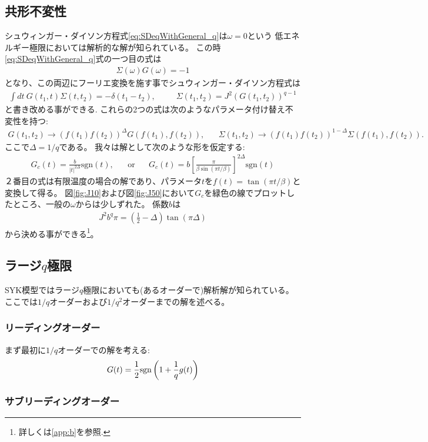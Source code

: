 \subsection{共形不変性}
シュウィンガー・ダイソン方程式\eqref{eq:SDeqWithGeneral_q}は$\omega = 0$という
低エネルギー極限においては解析的な解が知られている。
この時\eqref{eq:SDeqWithGeneral_q}式の一つ目の式は
\begin{align}
	\Sigma(\omega)G(\omega) = -1
\end{align}
となり、この両辺にフーリエ変換を施す事でシュウィンガー・ダイソン方程式は
\begin{align}
	\int dt\ G(t_1, t)\Sigma(t, t_2) = -\delta(t_1 - t_2),
	\hspace{30pt}
	\Sigma(t_1, t_2) = J^2 (G(t_1, t_2))^{q-1}
	\label{eq:conformalSD}
\end{align}
と書き改める事ができる.
これらの2つの式は次のようなパラメータ付け替え不変性を持つ:
\begin{align}
	G(t_1, t_2) \to (f(t_1)f(t_2))^{\Delta}G(f(t_1),f(t_2)),
	\hspace{20pt}
	\Sigma(t_1, t_2) \to (f(t_1)f(t_2))^{1 - \Delta}\Sigma(f(t_1),f(t_2)).
\end{align}
ここで$\Delta = 1 / q$である。
我々は解として次のような形を仮定する:
\begin{align}
	G_c(t) = \frac{b}{|t|^{2\Delta}}\mathrm{sgn}(t),
	\hspace{20pt}
	\mathrm{or}
	\hspace{20pt}
	G_c(t) = b\left[\frac{\pi}{\beta\sin(\pi t / \beta)}\right]^{2\Delta}\mathrm{sgn}(t)
	\label{eq:conformal_ansatz}
\end{align}
２番目の式は有限温度の場合の解であり、パラメータ$t$を$f(t) = \tan(\pi t / \beta)$と変換して得る。
図\ref{fig:J10}および図\ref{fig:J50}において$G_c$を緑色の線でプロットしたところ、一般の$\omega$からは少しずれた。
係数$b$は
\begin{align}
	J^2 b^q \pi = \left(\frac{1}{2} - \Delta \right)\tan(\pi \Delta)
\end{align}
から決める事ができる\footnote{詳しくは\ref{app:b}を参照.}。

\subsection{ラージ$q$極限}
SYK模型ではラージ$q$極限においても(あるオーダーで)解析解が知られている。
ここでは$1/q$オーダーおよび$1/q^2$オーダーまでの解を述べる。

\subsubsection{リーディングオーダー}
まず最初に$1/q$オーダーでの解を考える:
\begin{align}
  G(t) = \frac{1}{2}\mathrm{sgn}\left(1 + \frac{1}{q}g(t)\right)
\end{align}

\subsubsection{サブリーディングオーダー}





\pagebreak
